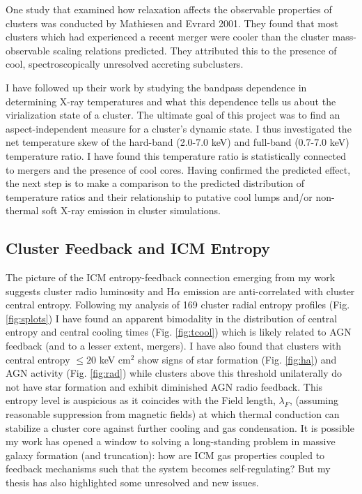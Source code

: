 \documentclass[11pt]{article}
\begin{document}
One study that examined how relaxation affects the observable
properties of clusters was conducted by Mathiesen and Evrard
2001. They found that most clusters which had experienced a recent
merger were cooler than the cluster mass-observable scaling relations
predicted. They attributed this to the presence of cool,
spectroscopically unresolved accreting subclusters.

I have followed up their work by studying the bandpass dependence in
determining X-ray temperatures and what this dependence tells us about
the virialization state of a cluster. The ultimate goal of this
project was to find an aspect-independent measure for a cluster's
dynamic state. I thus investigated the net temperature skew of the
hard-band (2.0-7.0 keV) and full-band (0.7-7.0 keV) temperature
ratio. I have found this temperature ratio is statistically connected
to mergers and the presence of cool cores. Having confirmed the
predicted effect, the next step is to make a comparison to the
predicted distribution of temperature ratios and their relationship to
putative cool lumps and/or non-thermal soft X-ray emission in cluster
simulations.

\subsection*{Cluster Feedback and ICM Entropy}

The picture of the ICM entropy-feedback connection emerging from my
work suggests cluster radio luminosity and H$\alpha$ emission are
anti-correlated with cluster central entropy. Following my analysis of 169
cluster radial entropy profiles (Fig. \ref{fig:splots}) I have found
an apparent bimodality in the distribution of central
entropy and central cooling times (Fig. \ref{fig:tcool}) which is
likely related to AGN feedback (and to a lesser extent, mergers). I
have also found that clusters with central entropy $\leq 20$ keV
cm$^2$ show signs of star formation (Fig. \ref{fig:ha}) and AGN
activity (Fig. \ref{fig:rad}) while clusters above this threshold
unilaterally do not have star formation and exhibit diminished AGN
radio feedback. This entropy level is auspicious as it coincides with
the Field length, $\lambda_F$, (assuming reasonable suppression from
magnetic fields) at which thermal conduction can stabilize a cluster
core against further cooling and gas condensation. It is possible my
work has opened a window to solving a long-standing problem in massive
galaxy formation (and truncation): how are ICM gas properties coupled
to feedback mechanisms such that the system becomes self-regulating?
But my thesis has also highlighted some unresolved and new
issues.
\end{document}
